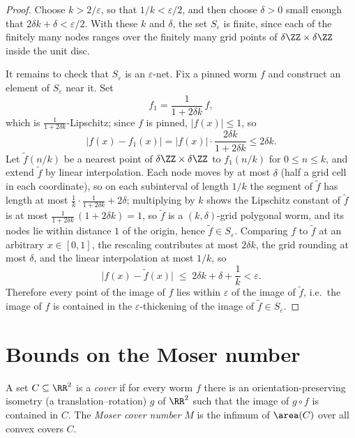 \begin{proof}
    Choose $k > 2/\varepsilon$, so that $1/k < \varepsilon/2$, and then choose
    $\delta > 0$ small enough that $2\delta k + \delta < \varepsilon/2$. With
    these $k$ and $\delta$, the set $S_\varepsilon$ is finite, since each of the
    finitely many nodes ranges over the finitely many grid points of
    $\delta\ZZ \times \delta\ZZ$ inside the unit disc.

    It remains to check that $S_\varepsilon$ is an $\varepsilon$-net. Fix a
    pinned worm $f$ and construct an element of $S_\varepsilon$ near it. Set
    \[
        f_1 = \frac{1}{1 + 2\delta k}\, f ,
    \]
    which is $\tfrac{1}{1+2\delta k}$-Lipschitz; since $f$ is pinned,
    $\lvert f(x) \rvert \le 1$, so
    \[
        \lvert f(x) - f_1(x) \rvert
            = \lvert f(x) \rvert \cdot \frac{2\delta k}{1 + 2\delta k}
            \le 2\delta k .
    \]
    Let $\tilde f(n/k)$ be a nearest point of $\delta\ZZ \times \delta\ZZ$ to
    $f_1(n/k)$ for $0 \le n \le k$, and extend $\tilde f$ by linear
    interpolation. Each node moves by at most $\delta$ (half a grid cell in
    each coordinate), so on each subinterval of length $1/k$ the segment of
    $\tilde f$ has length at most
    $\tfrac{1}{k}\cdot\tfrac{1}{1+2\delta k} + 2\delta$; multiplying by $k$
    shows the Lipschitz constant of $\tilde f$ is at most
    $\tfrac{1}{1+2\delta k}\,(1 + 2\delta k) = 1$, so $\tilde f$ is a
    $(k,\delta)$-grid polygonal worm, and its nodes lie within distance $1$ of
    the origin, hence $\tilde f \in S_\varepsilon$. Comparing $f$ to $\tilde f$
    at an arbitrary $x \in [0,1]$, the rescaling contributes at most
    $2\delta k$, the grid rounding at most $\delta$, and the linear
    interpolation at most $1/k$, so
    \[
        \lvert f(x) - \tilde f(x) \rvert
            \;\le\; 2\delta k + \delta + \frac{1}{k} < \varepsilon .
    \]
    Therefore every point of the image of $f$ lies within $\varepsilon$ of the
    image of $\tilde f$, i.e.\ the image of $f$ is contained in the
    $\varepsilon$-thickening of the image of $\tilde f \in S_\varepsilon$.
\end{proof}

\section{Bounds on the Moser number}

\begin{definition}
    \label{def:moserNumber}
    A set $C \subseteq \RR^2$ is a \emph{cover} if for every worm $f$ there is
    an orientation-preserving isometry (a translation--rotation) $g$ of $\RR^2$
    such that the image of $g \circ f$ is contained in $C$. The \emph{Moser
    cover number} $M$ is the infimum of $\area(C)$ over all convex covers $C$.
\end{definition}

